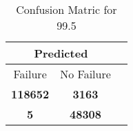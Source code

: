 \begin{table}[] 
\caption{Confusion Matric for 99.5} 
\label{Table: Prediction Accuracy-DMD99.5OnlySunEKF-resetReflectionEKF-top2-Reflection} 
\centering 
\begin{tabular} 
 {@{}ccc@{}} 
\toprule 
\multicolumn{2}{c}{\textbf{Predicted}}
 \\ \midrule 
\multicolumn{1}{|c|}{Failure} & 
\multicolumn{1}{c|}{No Failure}
 \\ \midrule 
\multicolumn{1}{|c|}{\color{green}\textbf{118652}} & 
\multicolumn{1}{c|}{\color{red}\textbf{3163}}
 \\ \midrule 
\multicolumn{1}{|c|}{\color{red}\textbf{5}} & 
\multicolumn{1}{c|}{\color{green}\textbf{48308}}
 \\ \bottomrule 
\end{tabular} 
\end{table} 
